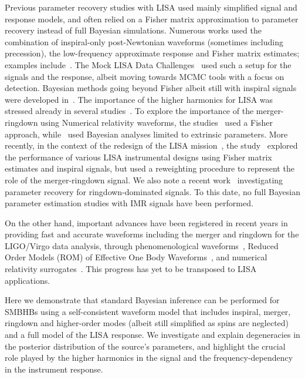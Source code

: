 \documentclass[aps,showpacs,twocolumn,prd,superscriptaddress,nofootinbib]{revtex4-1}
\begin{document}
Previous parameter recovery studies with LISA used mainly simplified signal and response models, and often relied on a Fisher matrix approximation to parameter recovery instead of full Bayesian simulations. Numerous works used the combination of inspiral-only post-Newtonian waveforms (sometimes including precession), the low-frequency approximate response and Fisher matrix estimates; examples include~\cite{Cutler97, Vecchio03, Arun06, Berti+04, LangHughes06}. The Mock LISA Data Challenges~\cite{MLDC09} used such a setup for the signals and the response, albeit moving towards MCMC tools with a focus on detection. Bayesian methods going beyond Fisher albeit still with inspiral signals were developed in~\cite{Brown+07, CornishPorter06a, Crowder+06, Wickham+06, Roever+07, Feroz+09, GairPorter09, Petiteau+09, PorterCarre13, PorterCornish15}. The importance of the higher harmonics for LISA was stressed already in several studies~\cite{Arun+07a, TriasSintes07, PorterCornish08, McWilliams+09}. To explore the importance of the merger-ringdown using Numerical relativity waveforms, the studies~\cite{Thorpe+08, McWilliams+09, McWilliams+10, McWilliams+11} used a Fisher approach, while~\cite{Babak+08} used Bayesian analyses limited to extrinsic parameters. More recently, in the context of the redesign of the LISA mission~\cite{elisa13}, the study~\cite{Klein+15} explored the performance of various LISA instrumental designs using Fisher matrix estimates and inspiral signals, but used a reweighting procedure to represent the role of the merger-ringdown signal. We also note a recent work~\cite{Baibhav+20} investigating parameter recovery for ringdown-dominated signals. To this date, no full Bayesian parameter estimation studies with IMR signals have been performed.

On the other hand, important advances have been registered in recent years in providing fast and accurate waveforms including the merger and ringdown for the LIGO/Virgo data analysis, through phenomenological waveforms~\cite{Khan+15, London+17}, Reduced Order Models (ROM) of Effective One Body Waveforms~\cite{Puerrer14, Bohe+16}, and numerical relativity surrogates~\cite{Blackman+17b, Varma+18}. This progress has yet to be transposed to LISA applications.

Here we demonstrate that standard Bayesian inference can be performed for SMBHBs using a self-consistent waveform model that includes inspiral, merger, ringdown and higher-order modes (albeit still simplified as spins are neglected) and a full model of the LISA response. We investigate and explain degeneracies in the posterior distribution of the source's parameters, and highlight the crucial role played by the higher harmonics in the signal and the frequency-dependency in the instrument response.
\end{document}
